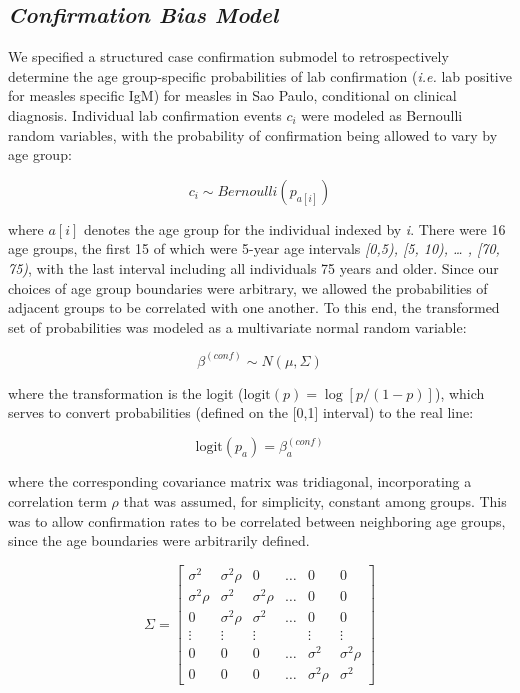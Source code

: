 \subsection{\texorpdfstring{\emph{Confirmation Bias
Model}}{Confirmation Bias Model}}\label{confirmation-bias-model}

We specified a structured case confirmation submodel to retrospectively
determine the age group-specific probabilities of lab confirmation (\emph{i.e.}
lab positive for measles specific IgM) for measles in Sao Paulo,
conditional on clinical diagnosis. Individual lab confirmation events
\(c_i\) were modeled as Bernoulli random variables,
with the probability of confirmation being allowed to vary by age group:

\[c_{i} \sim Bernoulli(p_{a[i]})\]

where \(a[i]\) denotes the age group for the individual
indexed by \emph{i}. There were 16 age groups, the first 15 of which
were 5-year age intervals \emph{{[}0,5), {[}5, 10), \ldots{} , {[}70,
75)}, with the last interval including all individuals 75 years and
older. Since our choices of age group boundaries were arbitrary, we
allowed the probabilities of adjacent groups to be correlated with one
another. To this end, the transformed set of probabilities was
modeled as a multivariate normal random variable: 

\[
\beta^{(conf)} \sim N(\mu, \Sigma)
\]

where the transformation is the logit (\(\text{logit}(p) = \log[p / (1-p)] \)), which serves to convert probabilities (defined on the [0,1] interval) to the real line:

\[
\text{logit}(p_a) = \beta_a^{(conf)}
\]

where the corresponding covariance matrix was tridiagonal, incorporating a
correlation term \(\rho\) that was assumed, for simplicity, constant among groups. This was to allow confirmation rates to be correlated between neighboring age groups, since the age boundaries were arbitrarily defined.

\[
\Sigma = \left[{
\begin{array}{cccccc}
  {\sigma^2} & {\sigma^2 \rho} & 0& \ldots & {0} & {0}  \\
  {\sigma^2 \rho} & {\sigma^2} &  \sigma^2 \rho & \ldots & {0}  & {0} \\
  {0} & \sigma^2 \rho & {\sigma^2} & \ldots & {0} & {0} \\
  \vdots & \vdots & \vdots &  & \vdots & \vdots\\
  {0} & {0} & 0 & \ldots &  {\sigma^2} & \sigma^2 \rho  \\
{0} & {0} & 0 & \ldots & \sigma^2 \rho &  {\sigma^2} 
\end{array}
}\right]\]


